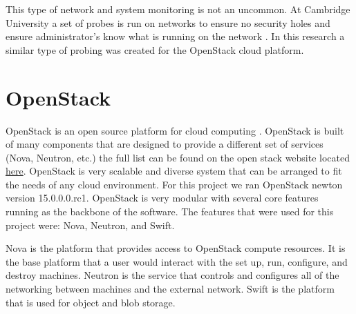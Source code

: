 \documentclass[12pt]{article}
\begin{document}
This type of network and system monitoring is not an uncommon. At Cambridge University a set of probes is run on networks to ensure no security holes and ensure administrator's know what is running on the network \cite{CambUni}. In this research a similar type of probing was created for the OpenStack cloud platform.


\section{OpenStack}
OpenStack is an open source platform for cloud computing \cite{wiki:OpenStack}. OpenStack is built of many components that are designed to provide a different set of services (Nova, Neutron, etc.) the full list can be found on the open stack website located \href{https://www.openstack.org/software/project-navigator/}{here}. OpenStack is very scalable and diverse system that can be arranged to fit the needs of any cloud environment. For this project we ran OpenStack newton version 15.0.0.0.rc1. OpenStack is very modular with several core features running as the backbone of the software. The features that were used for this project were: Nova, Neutron, and Swift.

Nova is the platform that provides access to OpenStack compute resources. It is the base platform that a user would interact with the set up, run, configure, and destroy machines. Neutron is the service that controls and configures all of the networking between machines and the external network. Swift is the platform that is used for object and blob storage.



\end{document}
